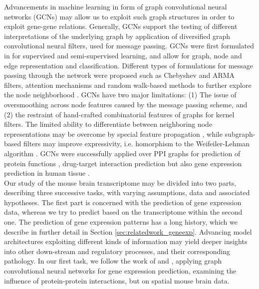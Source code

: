 \documentclass[]{article}
\renewcommand{\cite}{\citep}
\begin{document}
Advancements in machine learning in form of graph convolutional neural networks (GCNs) may allow us to exploit such graph structures in order to exploit gene-gene relations. Generally, GCNs support the testing of different interpretations of the underlying graph by application of diversified graph convolutional neural filters, used for message passing. GCNs were first formulated in \citet{GCNConv} for supervised and semi-supervised learning, and allow for graph, node and edge representation and classification. Different types of formulations for message passing through the network were proposed such as Chebyshev \cite{ChebConv} and ARMA \cite{ArmaConv} filters, attention mechanisms \cite{GATConv} and random walk-based methods to further explore the node neighborhood \cite{APPNPConv, SAGEConv}. GCNs have two major limitations: (1) The issue of oversmoothing across node features caused by the message passing scheme, and (2) the restraint of hand-crafted combinatorial features of graphs for kernel filters. The limited ability to differentiate between neighboring node representations may be overcome by special feature propagation \cite{GENConv2020}, while subgraph-based filters \citet{feng2022kergnns} may improve expressivity, i.e. homorphism to the Weifeiler-Lehman algorithm \cite{leman1968reduction}. 
GCNs were successfully applied over PPI graphs for prediction of protein functions \cite{Zitnik2017}, drug-target interaction prediction \cite{hinnerichs2021dti} but also gene expression prediction in human tissue \cite{schulte2021integration, wang2021mogonet}.\\ 

Our study of the mouse brain transcriptome may be divided into two parts, describing three successive tasks, with varying assumptions, data and associated hypotheses. 
The first part is concerned with the prediction of gene expression data, whereas we try to predict based on the transcriptome within the second one. 
The prediction of gene expression patterns has a long history, which we describe in further detail in Section \ref{sec:relatedwork_geneexp}. Advancing model architectures exploiting different kinds of information may yield deeper insights into other down-stream and regulatory processes, and their corresponding pathology. In our first task, we follow the work of \citet{wang2021mogonet} and \citet{schulte2021integration}, applying graph convolutional neural networks for gene expression prediction, examining the influence of protein-protein interactions, but on spatial mouse brain data.\\
\end{document}
